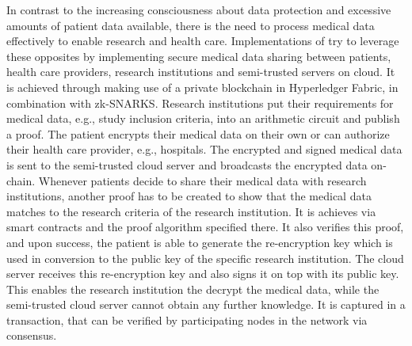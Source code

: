 In contrast to the increasing consciousness about data protection and excessive amounts of patient data available, there is the need to process medical data effectively to enable research and health care. Implementations of \citet{Huangetal} try to leverage these opposites by implementing secure medical data sharing between patients, health care providers, research institutions and semi-trusted servers on cloud. It is achieved through making use of a private blockchain in Hyperledger Fabric, in combination with zk-SNARKS. Research institutions put their requirements for medical data, e.g., study inclusion criteria, into an arithmetic circuit and publish a proof. The patient encrypts their medical data on their own or can authorize their health care provider, e.g., hospitals. The encrypted and signed medical data is sent to the semi-trusted cloud server and broadcasts the encrypted data on-chain. Whenever patients decide to share their medical data with research institutions, another proof has to be created to show that the medical data matches to the research criteria of the research institution. It is achieves via smart contracts and the proof algorithm specified there. It also verifies this proof, and upon success, the patient is able to generate the re-encryption key which is used in conversion to the public key of the specific research institution. The cloud server receives this re-encryption key and also signs it on top with its public key. This enables the research institution the decrypt the medical data, while the semi-trusted cloud server cannot obtain any further knowledge. It is captured in a transaction, that can be verified by participating nodes in the network via consensus.

